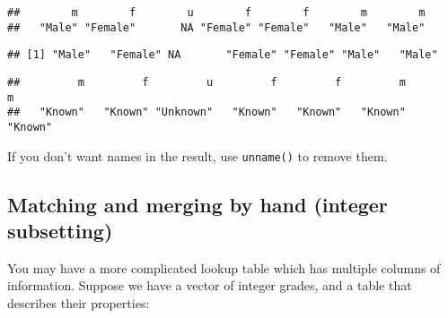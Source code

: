 \begin{verbatim}
##        m        f        u        f        f        m        m 
##   "Male" "Female"       NA "Female" "Female"   "Male"   "Male"
\end{verbatim}

\begin{Shaded}
\begin{Highlighting}[]
\end{Highlighting}
\end{Shaded}

\begin{verbatim}
## [1] "Male"   "Female" NA       "Female" "Female" "Male"   "Male"
\end{verbatim}

\begin{Shaded}
\begin{Highlighting}[]
\NormalTok{(} \NormalTok{, } \NormalTok{, } \NormalTok{)[x]}
\end{Highlighting}
\end{Shaded}

\begin{verbatim}
##         m         f         u         f         f         m         m 
##   "Known"   "Known" "Unknown"   "Known"   "Known"   "Known"   "Known"
\end{verbatim}

If you don't want names in the result, use \texttt{unname()} to remove
them.

\hypertarget{matching-merging}{%
\subsection{Matching and merging by hand (integer
subsetting)}\label{matching-merging}}

You may have a more complicated lookup table which has multiple columns
of information. Suppose we have a vector of integer grades, and a table
that describes their properties: 

\begin{Shaded}
\begin{Highlighting}[]
\StringTok{ }\NormalTok{(}\NormalTok{, }\NormalTok{, }\NormalTok{, }\NormalTok{, }\NormalTok{)}

\StringTok{ }\NormalTok{(}
   \OperatorTok{:}\NormalTok{,}
   \NormalTok{(}\NormalTok{, }\NormalTok{, }\NormalTok{),}
   
\NormalTok{)}
\end{Highlighting}
\end{Shaded}

